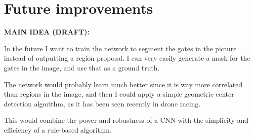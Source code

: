 \chapter{Future improvements}

\textbf{MAIN IDEA (DRAFT):}

In the future I want to train the network to segment the gates in the
picture instead of outputting a region proposal. I can very easily generate a
mask for the gates in the image, and use that as a ground truth.

The network would probably learn much better since it is way more correlated
than regions in the image, and then I could apply a simple geometric center
detection algorithm, as it has been seen recently in drone racing.


This would combine the power and robustness of a CNN with the simplicity and
efficiency of a rule-based algorithm.
